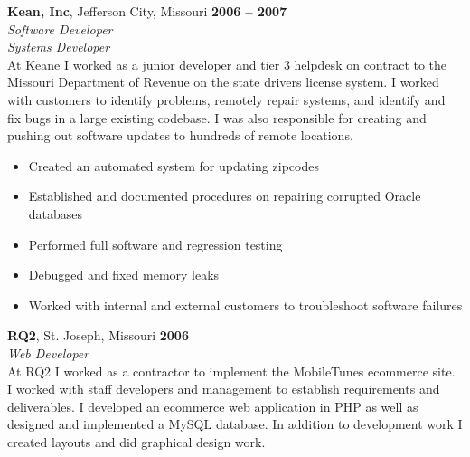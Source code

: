 \documentclass[margin,line]{resume}
\begin{document}
\begin{resume}
\textbf{Kean, Inc}, Jefferson City, Missouri \hfill \textbf{2006 -- 2007}\vspace{1mm}\\\vspace{1mm}%
\textit{\small{Software Developer}}\vspace{1mm}\\\vspace{0mm}%
\textsl{Systems Developer}\\
At Keane I worked as a junior developer and tier 3 helpdesk on contract to the
Missouri Department of Revenue on the state drivers license system. I worked
with customers to identify problems, remotely repair systems, and identify and
fix bugs in a large existing codebase. I was also responsible for creating and
pushing out software updates to hundreds of remote locations.
\vspace{1mm}\\\vspace{0mm}
\begin{itemize}
\item Created an automated system for updating zipcodes
\item Established and documented procedures on repairing corrupted Oracle
      databases
\item Performed full software and regression testing
\item Debugged and fixed memory leaks
\item Worked with internal and external customers to troubleshoot software
      failures
\end{itemize}

\textbf{RQ2}, St. Joseph, Missouri \hfill \textbf{2006}\vspace{1mm}\\\vspace{1mm}%
\textit{\small{Web Developer}}\vspace{1mm}\\\vspace{0mm}%
At RQ2 I worked as a contractor to implement the MobileTunes ecommerce site. I
worked with staff developers and management to establish requirements and
deliverables. I developed an ecommerce web application in PHP as well as
designed and implemented a MySQL database. In addition to development work I
created layouts and did graphical design work.


\end{resume}
\end{document}
